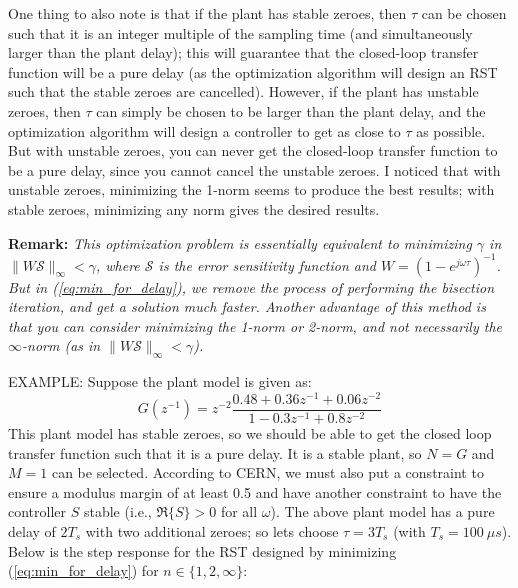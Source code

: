 \documentclass[12pt]{article}
\begin{document}
One thing to also note is that if the plant has stable zeroes, then $\tau$ can be chosen such that it is an integer multiple of the sampling time (and simultaneously larger than the plant delay); this will guarantee that the closed-loop transfer function will be a pure delay (as the optimization algorithm will design an RST such that the stable zeroes are cancelled). However, if the plant has unstable zeroes, then $\tau$ can simply be chosen to be larger than the plant delay, and the optimization algorithm will design a controller to get as close to $\tau$ as possible. But with unstable zeroes, you can never get the closed-loop transfer function to be a pure delay, since you cannot cancel the unstable zeroes. I noticed that with unstable zeroes, minimizing the 1-norm seems to produce the best results; with stable zeroes, minimizing any norm gives the desired results.

{\bf Remark:} \textit{This optimization problem is essentially equivalent to minimizing $\gamma$ in $\| W \mathcal{S}\|_\infty < \gamma$, where $\mathcal{S}$ is the error sensitivity function and $W = (1-e^{j\omega \tau})^{-1}$. But in (\ref{eq:min_for_delay}), we remove the process of performing the bisection iteration, and get a solution much faster. Another advantage of this method is that you can consider minimizing the 1-norm or 2-norm, and not necessarily the $\infty$-norm (as in $\| W \mathcal{S}\|_\infty < \gamma$).}

\vspace{1cm}
EXAMPLE: Suppose the plant model is given as:
\begin{equation}
G(z^{-1}) = z^{-2} \frac{0.48 + 0.36 z^{-1} + 0.06 z^{-2}}{ 1 - 0.3 z^{-1} + 0.8 z^{-2}}
\end{equation} 
 This plant model has stable zeroes, so we should be able to get the closed loop transfer function such that it is a pure delay. It is a stable plant, so $N = G$ and $M=1$ can be selected. According to CERN, we must also put a constraint to ensure a modulus margin of at least 0.5 and have another constraint to have the controller $S$ stable (i.e., $\Re \{ S\} > 0$ for all $\omega$). The above plant model has a pure delay of $2T_s$ with two additional zeroes; so lets choose $\tau = 3T_s$ (with $T_s = 100 \: \mu s$). Below is the step response for the RST designed by minimizing (\ref{eq:min_for_delay}) for $n \in \{1,2,\infty \}$:
 
\end{document}
